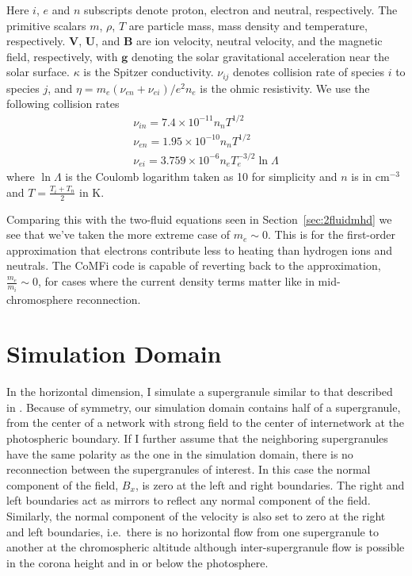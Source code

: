 \documentclass[12pt,upcase]{umlthesis}
\begin{document}
Here $i$, $e$ and $n$ subscripts denote proton, electron and neutral, respectively. The primitive scalars $m$, $\rho$, $T$ are particle mass, mass density and temperature, respectively. $\textbf{V}$, $\textbf{U}$, and $\textbf{B}$ are ion velocity, neutral velocity, and the magnetic field, respectively, with $\textbf{g}$ denoting the solar gravitational acceleration near the solar surface. $\kappa$ is the Spitzer conductivity. $\nu_{ij}$ denotes collision rate of species $i$ to species $j$, and $\eta = m_e(\nu_{en} + \nu_{ei})/e^2n_e$ is the ohmic resistivity. We use the following collision rates \citep[see][Appendix A]{Pontieu2001} 
\begin{eqnarray}
&\nu_{in} = 7.4 \times 10^{-11} n_n T^{1/2}& \nonumber\\
&\nu_{en} = 1.95 \times 10^{-10} n_n T^{1/2}& \\
&\nu_{ei} = 3.759 \times 10^{-6} n_e T_e^{-3/2} \ln \Lambda& \nonumber
\end{eqnarray}
where $\ln \Lambda$ is the Coulomb logarithm taken as 10 for simplicity and $n$ is in cm$^{-3}$ and $T = \frac{T_i + T_n}{2}$ in K.

Comparing this with the two-fluid equations seen in Section~\ref{sec:2fluidmhd} we see that we've taken the more extreme case of $m_e \sim 0$. This is for the first-order approximation that electrons contribute less to heating than hydrogen ions and neutrals. The CoMFi code is capable of reverting back to the approximation, $\frac{m_e}{m_i} \sim 0$, for cases where the current density terms matter like in mid-chromosphere reconnection.

\section{Simulation Domain}\label{sec:simulationdomain}

In the horizontal dimension, I simulate a supergranule similar to that described in \citet{Song2017}. Because of symmetry, our simulation domain contains half of a supergranule, from the center of a network with strong field to the center of internetwork at the photospheric boundary. If I further assume that the neighboring supergranules have the same polarity as the one in the simulation domain, there is no reconnection between the supergranules of interest.  In this case  the normal component of the field, $B_x$, is zero at the left and right boundaries. The right and left boundaries act as mirrors to reflect any normal component of the field. Similarly, the normal component of the velocity is also set to zero at the right and left boundaries, i.e.\ there is no horizontal flow from one supergranule to another at the chromospheric altitude although inter-supergranule flow is possible in the corona height and in or below the photosphere. 
\end{document}
